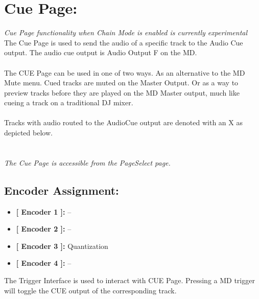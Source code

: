  \chapter{Cue Page:}
 \textit{Cue Page functionality when Chain Mode is enabled is currently experimental}\\
 The Cue Page is used to send the audio of a specific track to the Audio Cue output. The audio cue output is Audio Output F on the MD.\\
 \\
 The CUE Page can be used in one of two ways. As an alternative to the MD Mute menu. Cued tracks are muted on the Master Output. Or as a way to preview tracks before they are played on the MD Master output, much like cueing a track on a traditional DJ mixer.\\
\\Tracks with audio routed to the AudioCue output are denoted with an X as depicted below.\\

\\\\
 \textit{The Cue Page is accessible from the PageSelect page.}
  \section{Encoder Assignment:}
 \begin{itemize}
 	\item \textbf{[ Encoder 1 ]: } --
 	\item \textbf{[ Encoder 2 ]: } --
 	\item \textbf{[ Encoder 3 ]: } Quantization
 	\item \textbf{[ Encoder 4 ]: } --
 \end{itemize}
 The Trigger Interface is used to interact with CUE Page. Pressing a MD trigger will toggle the CUE output of the corresponding track.
 
